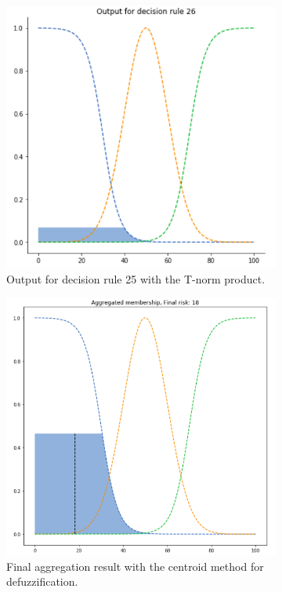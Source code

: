 \documentclass[conference]{IEEEtran}
\begin{document}
\begin{figure}[ht]
\begin{subfigure}{.5\textwidth}
  \centering
  \includegraphics[width=.8\linewidth]{figures/first/prod3.png}  
  \caption{Output for decision rule 25 with the T-norm product.}
  \label{fig:1prod3}
\end{subfigure}
\begin{subfigure}{.5\textwidth}
  \centering
  \includegraphics[width=.8\linewidth]{figures/first/prod-centroid.png}  
  \caption{Final aggregation result with the centroid method for defuzzification.}
  \label{fig:1prod-centroid}
\end{subfigure}
\begin{subfigure}{.5\textwidth}

\end{subfigure}
\end{figure}
\end{document}
